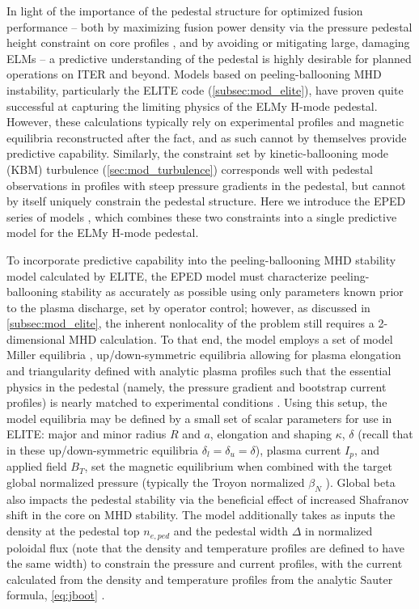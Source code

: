 In light of the importance of the pedestal structure for optimized fusion performance -- both by maximizing fusion power density via the pressure pedestal height constraint on core profiles \cite{Kinsey2011}, and by avoiding or mitigating large, damaging ELMs \cite{Loarte2003,Federici2003} -- a predictive understanding of the pedestal is highly desirable for planned operations on ITER and beyond.  Models based on peeling-ballooning MHD instability, particularly the ELITE code (\cref{subsec:mod_elite}), have proven quite successful at capturing the limiting physics of the ELMy H-mode pedestal.  However, these calculations typically rely on experimental profiles and magnetic equilibria reconstructed after the fact, and as such cannot by themselves provide predictive capability.  Similarly, the constraint set by kinetic-ballooning mode (KBM) turbulence (\cref{sec:mod_turbulence}) corresponds well with pedestal observations in profiles with steep pressure gradients in the pedestal, but cannot by itself uniquely 
constrain the pedestal structure.  Here we introduce the EPED series of models \cite{Snyder2011}, which combines these two constraints into a single predictive model for the ELMy H-mode pedestal.

To incorporate predictive capability into the peeling-ballooning MHD stability model calculated by ELITE, the EPED model must characterize peeling-ballooning stability as accurately as possible using only parameters known prior to the plasma discharge, set by operator control; however, as discussed in \cref{subsec:mod_elite}, the inherent nonlocality of the problem still requires a 2-dimensional MHD calculation.  To that end, the model employs a set of model Miller equilibria \cite{Miller1998}, up/down-symmetric equilibria allowing for plasma elongation and triangularity defined with analytic plasma profiles such that the essential physics in the pedestal (namely, the pressure gradient and bootstrap current profiles) is nearly matched to experimental conditions \cite{Snyder2009}.  Using this setup, the model equilibria may be defined by a small set of scalar parameters for use in ELITE: major and minor radius $R$ and $a$, elongation and shaping $\kappa$, $\delta$ (recall that in these up/down-symmetric 
equilibria $\delta_l = \delta_u = \delta$), plasma current $I_p$, and applied field $B_T$, set the magnetic equilibrium when combined with the target global normalized pressure (typically the Troyon normalized $\beta_N$ \cite{Troyon1984}).  Global beta also impacts the pedestal stability via the beneficial effect of increased Shafranov shift in the core on MHD stability.  The model additionally takes as inputs the density at the pedestal top $n_{e,ped}$ and the pedestal width $\Delta$ in normalized poloidal flux (note that the density and temperature profiles are defined to have the same width) to constrain the pressure and current profiles, with the current calculated from the density and temperature profiles from the analytic Sauter formula, \cref{eq:jboot} \cite{Sauter1999}.

